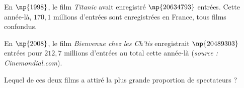 \begin{exo}{}
	En $\np{1998}$, le film \textit{Titanic} avait enregistré $\np{20634793}$ entrées. Cette année-là, $170,1$ millions d'entrées sont enregistrées en France, tous films confondus.


	En $\np{2008}$, le film \textit{Bienvenue chez les Ch'tis} enregistrait $\np{20489303}$ entrées pour $212,7$ millions d'entrées au total cette année-là (\textit{source : Cinemondial.com}).


	Lequel de ces deux films a attiré la plus grande proportion de spectateurs ?
\end{exo}
